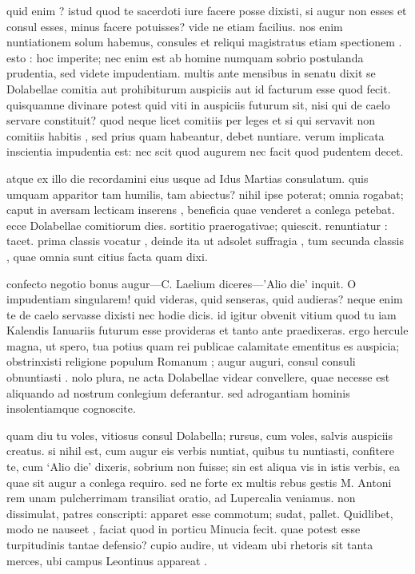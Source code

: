  quid enim ? istud quod te sacerdoti iure facere posse dixisti, si augur non esses et consul esses, minus facere potuisses? vide ne etiam facilius. nos enim nuntiationem solum habemus, consules et reliqui magistratus etiam spectionem . esto : hoc imperite; nec enim est ab homine numquam sobrio postulanda prudentia, sed videte impudentiam. multis ante mensibus in senatu dixit se Dolabellae comitia aut prohibiturum auspiciis aut id facturum esse quod fecit. quisquamne divinare potest quid viti in auspiciis futurum sit, nisi qui de caelo servare constituit? quod neque licet comitiis per leges et si qui servavit non comitiis habitis , sed prius quam habeantur, debet nuntiare. verum implicata inscientia impudentia est: nec scit quod augurem nec facit quod pudentem decet.

 atque ex illo die recordamini eius usque ad Idus Martias consulatum. quis umquam apparitor tam humilis, tam abiectus? nihil ipse poterat; omnia rogabat; caput in aversam lecticam inserens , beneficia quae venderet a conlega petebat. ecce Dolabellae comitiorum dies. sortitio praerogativae; quiescit. renuntiatur : tacet. prima classis vocatur , deinde ita ut adsolet suffragia , tum secunda classis , quae omnia sunt citius facta quam dixi.

 confecto negotio bonus augur—C. Laelium diceres—'Alio die' inquit. O impudentiam singularem! quid videras, quid senseras, quid audieras? neque enim te de caelo servasse dixisti nec hodie dicis. id igitur obvenit vitium quod tu iam Kalendis Ianuariis futurum esse provideras et tanto ante praedixeras. ergo hercule magna, ut spero, tua potius quam rei publicae calamitate ementitus es auspicia; obstrinxisti religione populum Romanum ; augur auguri, consul consuli obnuntiasti . nolo plura, ne acta Dolabellae videar convellere, quae necesse est aliquando ad nostrum conlegium deferantur. sed adrogantiam hominis insolentiamque cognoscite.

 quam diu tu voles, vitiosus consul Dolabella; rursus, cum voles, salvis auspiciis creatus. si nihil est, cum augur eis verbis nuntiat, quibus tu nuntiasti, confitere te, cum `Alio die' dixeris, sobrium non fuisse; sin est aliqua vis in istis verbis, ea quae sit augur a conlega requiro. sed ne forte ex multis rebus gestis M. Antoni rem unam pulcherrimam transiliat oratio, ad Lupercalia veniamus. non dissimulat, patres conscripti: apparet esse commotum; sudat, pallet. Quidlibet, modo ne nauseet , faciat quod in porticu Minucia fecit. quae potest esse turpitudinis tantae defensio? cupio audire, ut videam ubi rhetoris sit tanta merces, ubi campus Leontinus appareat .

